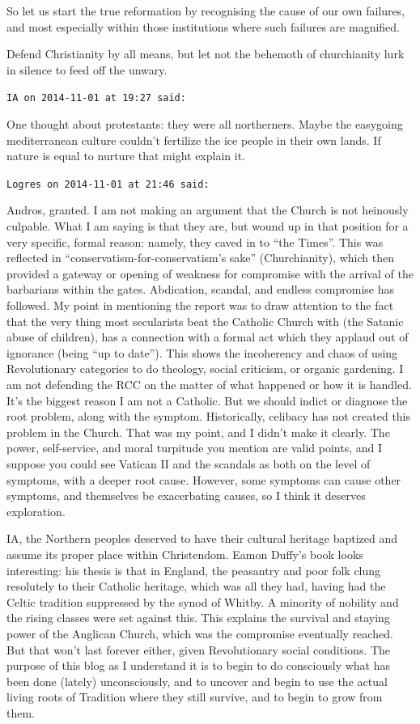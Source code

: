 \begin{footnotesize}
\begin{sffamily}
So let us start the true reformation by recognising the cause of our own failures, and most especially within those institutions where such failures are magnified.

Defend Christianity by all means, but let not the behemoth of churchianity lurk in silence to feed off the unwary.

\hfill

\texttt{IA on 2014-11-01 at 19:27 said:}

One thought about protestants: they were all northerners. Maybe the easygoing mediterranean culture couldn't fertilize the ice people in their own lands. If nature is equal to nurture that might explain it.

\hfill

\texttt{Logres on 2014-11-01 at 21:46 said:}

Andros, granted. I am not making an argument that the Church is not heinously culpable. What I am saying is that they are, but wound up in that position for a very specific, formal reason: namely, they caved in to ``the Times''. This was reflected in ``conservatism-for-conservatism's sake'' (Churchianity), which then provided a gateway or opening of weakness for compromise with the arrival of the barbarians within the gates. Abdication, scandal, and endless compromise has followed. My point in mentioning the report was to draw attention to the fact that the very thing most secularists beat the Catholic Church with (the Satanic abuse of children), has a connection with a formal act which they applaud out of ignorance (being ``up to date''). This shows the incoherency and chaos of using Revolutionary categories to do theology, social criticism, or organic gardening. I am not defending the RCC on the matter of what happened or how it is handled. It's the biggest reason I am not a Catholic. But we should indict or diagnose the root problem, along with the symptom. Historically, celibacy has not created this problem in the Church. That was my point, and I didn't make it clearly. The power, self-service, and moral turpitude you mention are valid points, and I suppose you could see Vatican II and the scandals as both on the level of symptoms, with a deeper root cause. However, some symptoms can cause other symptoms, and themselves be exacerbating causes, so I think it deserves exploration.

IA, the Northern peoples deserved to have their cultural heritage baptized and assume its proper place within Christendom. Eamon Duffy's book looks interesting: his thesis is that in England, the peasantry and poor folk clung resolutely to their Catholic heritage, which was all they had, having had the Celtic tradition suppressed by the synod of Whitby. A minority of nobility and the rising classes were set against this. This explains the survival and staying power of the Anglican Church, which was the compromise eventually reached. But that won't last forever either, given Revolutionary social conditions. The purpose of this blog as I understand it is to begin to do consciously what has been done (lately) unconsciously, and to uncover and begin to use the actual living roots of Tradition where they still survive, and to begin to grow from them.


\end{sffamily}
\end{footnotesize}
